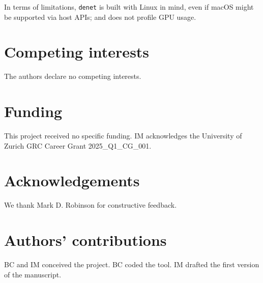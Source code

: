 \documentclass[10pt]{article}
\newcommand{\beginsupplement}{%
        \setcounter{table}{0}
        \renewcommand{\thetable}{S\arabic{table}}%
        \setcounter{figure}{0}
        \renewcommand{\thefigure}{S\arabic{figure}}%
        \setcounter{section}{0}
        \renewcommand{\thesection}{S\arabic{section}}%
      }
\begin{document}
In terms of limitations, \texttt{denet} is built with Linux in mind, even if macOS might be supported via host APIs; and does not profile GPU usage.

\section*{Competing interests}

The authors declare no competing interests.

\section*{Funding}

This project received no specific funding. IM acknowledges the University of Zurich GRC Career Grant 2025\_Q1\_CG\_001.

\section*{Acknowledgements}

We thank Mark D. Robinson for constructive feedback.

\section*{Authors' contributions}

BC and IM conceived the project. BC coded the tool. IM drafted the first version of the manuscript.




\clearpage


\end{document}
